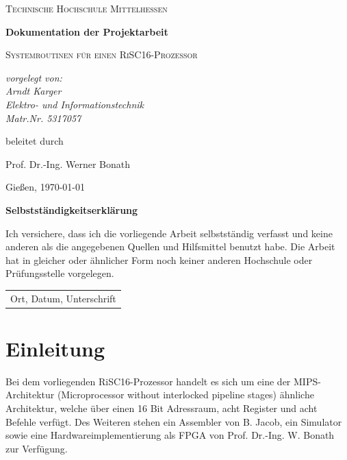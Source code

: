 \documentclass[fleqn, a4paper, 11pt]{article}       %
\begin{document}
\begin{titlepage}
	\centering
	{\scshape\LARGE Technische Hochschule Mittelhessen \par}
	\vspace{1cm}
	{\huge\bfseries Dokumentation der Projektarbeit \par}
	\vspace{1.5cm}
	{\scshape\Large Systemroutinen für einen RiSC16-Prozessor \par}
	\vspace{2cm}
	{\Large\itshape vorgelegt von: \\ Arndt Karger \\ Elektro-  und Informationstechnik\\ Matr.Nr. 5317057\par}
	\vfill
	beleitet durch\par
    Prof. Dr.-Ing. Werner Bonath
	\vfill

	{\large Gießen, \today\par}
\end{titlepage}

\thispagestyle{empty}
{\huge\bfseries Selbstständigkeitserklärung \par}
\vspace{1cm}

\noindent Ich versichere, dass ich die vorliegende Arbeit selbstständig verfasst und keine anderen als die angegebenen
Quellen und Hilfsmittel benutzt habe. Die Arbeit hat in gleicher oder ähnlicher Form noch keiner anderen
Hochschule oder Prüfungsstelle vorgelegen.

\vspace{4cm}
\begin{flushleft}
\begin{tabular}{@{}l@{}}\hline
Ort, Datum, Unterschrift
\end{tabular}
\end{flushleft}

\newpage
\thispagestyle{empty}
\tableofcontents
\newpage
\setcounter{page}{1}

\section{Einleitung}
Bei dem vorliegenden RiSC16-Prozessor handelt es sich um eine der MIPS-Architektur (Microprocessor without interlocked pipeline stages) \cite{MIPS} ähnliche Architektur, welche über einen 16 Bit Adressraum, acht Register und acht Befehle verfügt. Des Weiteren stehen ein Assembler von B. Jacob, ein Simulator sowie eine Hardwareimplementierung als FPGA von Prof. Dr.-Ing. W. Bonath zur Verfügung.
\end{document}
